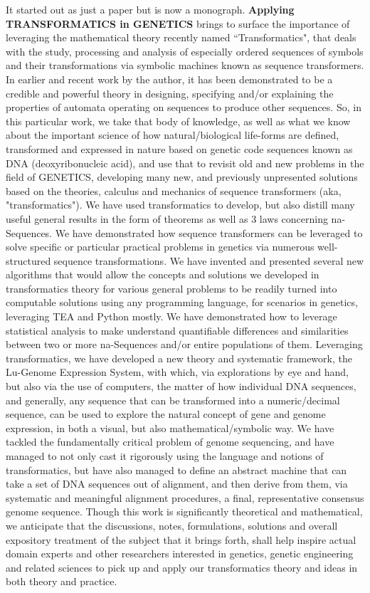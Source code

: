 \documentclass[a4paper, 18pt]{book} %
\begin{document}
It started out as just a paper but is now a monograph. \textbf{Applying TRANSFORMATICS in GENETICS} brings to surface the importance of leveraging the mathematical theory recently named ``Transformatics", that deals with the study, processing and analysis of especially ordered sequences of symbols and their transformations via symbolic machines known as sequence transformers. In earlier and recent work by the author, it has been demonstrated to be a credible and powerful theory in designing, specifying and/or explaining the properties of automata operating on sequences to produce other sequences. So, in this particular work, we take that body of knowledge, as well as what we know about the important science of how natural/biological life-forms are defined, transformed and expressed in nature based on genetic code sequences known as DNA (deoxyribonucleic acid), and use that to revisit old and new problems in the field of GENETICS, developing many new, and previously unpresented solutions based on the theories, calculus and mechanics of sequence transformers (aka, "transformatics"). We have used transformatics to develop, but also distill many useful general results in the form of theorems as well as 3 laws concerning na-Sequences. We have demonstrated how sequence transformers can be leveraged to solve specific or particular practical problems in genetics via numerous well-structured sequence transformations. We have invented and presented several new algorithms that would allow the concepts and solutions we developed in transformatics theory for various general problems to be readily turned into computable solutions using any programming language, for scenarios in genetics, leveraging TEA and Python mostly. We have demonstrated how to leverage statistical analysis to make understand quantifiable differences and similarities between two or more na-Sequences and/or entire populations of them. Leveraging transformatics, we have developed a new theory and systematic framework, the Lu-Genome Expression System, with which, via explorations by eye and hand, but also via the use of computers, the matter of how individual DNA sequences, and generally, any sequence that can be transformed into a numeric/decimal sequence, can be used to explore the natural concept of gene and genome expression, in both a visual, but also mathematical/symbolic way. We have tackled the fundamentally critical problem of genome sequencing, and have managed to not only cast it rigorously using the language and notions of transformatics, but have also managed to define an abstract machine that can take a set of DNA sequences out of alignment, and then derive from them, via systematic and meaningful alignment procedures, a final, representative consensus genome sequence. Though this work is significantly theoretical and mathematical, we anticipate that the discussions, notes, formulations, solutions and overall expository treatment of the subject that it brings forth, shall help inspire actual domain experts and other researchers interested in genetics, genetic engineering and related sciences to pick up and apply our transformatics theory and ideas in both theory and practice.
\end{document}

